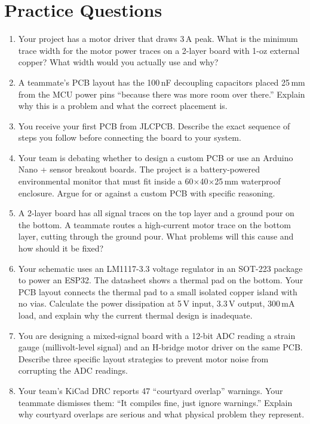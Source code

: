 \section{Practice Questions}
\begin{enumerate}[leftmargin=1.5em]
\item Your project has a motor driver that draws 3\,A peak. What is the minimum trace width for the motor power traces on a 2-layer board with 1-oz external copper? What width would you actually use and why?
\item A teammate's PCB layout has the 100\,nF decoupling capacitors placed 25\,mm from the MCU power pins ``because there was more room over there.'' Explain why this is a problem and what the correct placement is.
\item You receive your first PCB from JLCPCB. Describe the exact sequence of steps you follow before connecting the board to your system.
\item Your team is debating whether to design a custom PCB or use an Arduino Nano + sensor breakout boards. The project is a battery-powered environmental monitor that must fit inside a 60$\times$40$\times$25\,mm waterproof enclosure. Argue for or against a custom PCB with specific reasoning.
\item A 2-layer board has all signal traces on the top layer and a ground pour on the bottom. A teammate routes a high-current motor trace on the bottom layer, cutting through the ground pour. What problems will this cause and how should it be fixed?
\item Your schematic uses an LM1117-3.3 voltage regulator in an SOT-223 package to power an ESP32. The datasheet shows a thermal pad on the bottom. Your PCB layout connects the thermal pad to a small isolated copper island with no vias. Calculate the power dissipation at 5\,V input, 3.3\,V output, 300\,mA load, and explain why the current thermal design is inadequate.
\item You are designing a mixed-signal board with a 12-bit ADC reading a strain gauge (millivolt-level signal) and an H-bridge motor driver on the same PCB. Describe three specific layout strategies to prevent motor noise from corrupting the ADC readings.
\item Your team's KiCad DRC reports 47 ``courtyard overlap'' warnings. Your teammate dismisses them: ``It compiles fine, just ignore warnings.'' Explain why courtyard overlaps are serious and what physical problem they represent.
\end{enumerate}

